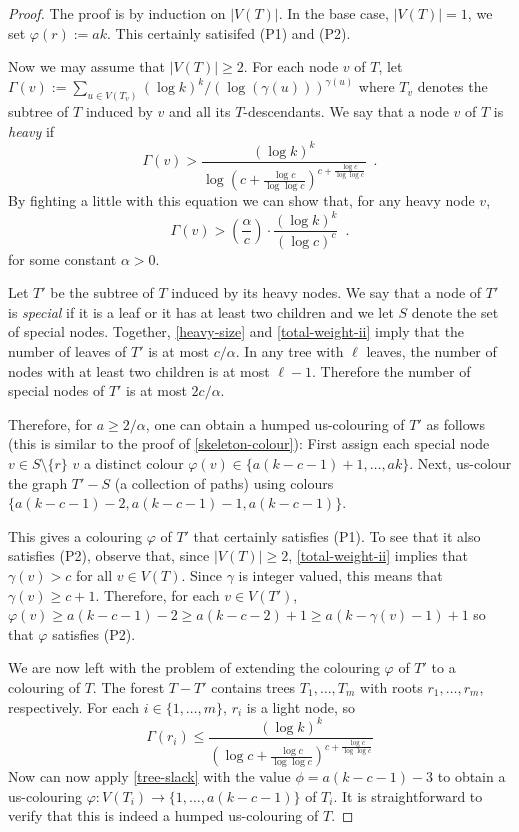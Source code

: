 \documentclass[kpfonts]{patmorin}
\begin{document}
\begin{proof}
    The proof is by induction on $|V(T)|$. In the base case, $|V(T)|=1$, we set $\varphi(r):=ak$.  This certainly satisifed (P1) and (P2).

    Now we may assume that $|V(T)|\ge 2$.  For each node $v$ of $T$, let $\Gamma(v):=\sum_{u\in V(T_v)}(\log k)^k/(\log(\gamma(u)))^{\gamma(u)}$ where $T_v$ denotes the subtree of $T$ induced by $v$ and all its $T$-descendants.  We say that a node $v$ of $T$ is \emph{heavy} if
    \[
        \Gamma(v)> \frac{(\log k)^k}{\log\left(c+\frac{\log c}{\log\log c}\right)^{c+\frac{\log c}{\log\log c}}} \enspace .
    \]
    By fighting a little with this equation we can show that, for any heavy node $v$,
    \begin{equation}
        \Gamma(v) > \left(\frac{\alpha}{c}\right)\cdot
            \frac{(\log k)^k}{(\log c)^c} \enspace . \label{heavy-size}
    \end{equation}
    for some constant $\alpha > 0$.

    Let $T'$ be the subtree of $T$ induced by its heavy nodes.  We say that a node of $T'$ is \emph{special} if it is a leaf or it has at least two children and we let $S$ denote the set of special nodes.  Together, \cref{heavy-size} and \cref{total-weight-ii} imply that the number of leaves of $T'$ is at most $c/\alpha$.  In any tree with $\ell$ leaves, the number of nodes with at least two children is at most $\ell-1$.  Therefore the number of special nodes of $T'$ is at most $2c/\alpha$.

    Therefore, for $a\ge 2/\alpha$, one can obtain a humped us-colouring of $T'$ as follows (this is similar to the proof of \cref{skeleton-colour}):  First assign each special node $v\in S\setminus\{r\}$ $v$ a distinct colour $\varphi(v)\in\{a(k-c-1)+1,\ldots,ak\}$.  Next, us-colour the graph $T'-S$ (a collection of paths) using colours $\{a(k-c-1)-2,a(k-c-1)-1,a(k-c-1)\}$.

    This gives a colouring $\varphi$ of $T'$ that certainly satisfies (P1).  To see that it also satisfies (P2), observe that, since $|V(T)|\ge 2$, \cref{total-weight-ii} implies that $\gamma(v) > c$ for all $v\in V(T)$. Since $\gamma$ is integer valued, this means that $\gamma(v)\ge c+1$.  Therefore, for each $v\in V(T')$, $\varphi(v)\ge a(k-c-1)-2 \ge a(k-c-2)+1\ge a(k-\gamma(v)-1)+1$ so that $\varphi$ satisfies (P2).

    We are now left with the problem of extending the colouring $\varphi$ of $T'$ to a colouring of $T$.  The forest $T-T'$ contains trees $T_1,\ldots,T_m$ with roots $r_1,\ldots,r_m$, respectively.  For each $i\in\{1,\ldots,m\}$, $r_i$ is a light node, so
    \[
        \Gamma(r_i) \le \frac{(\log k)^k}{\left(\log c + \frac{\log c}{\log\log c}\right)^{c+\frac{\log c}{\log\log c}}}
    \]
    Now can now apply \cref{tree-slack} with the value $\phi = a(k-c-1)-3$ to obtain a us-colouring $\varphi:V(T_i)\to\{1,\ldots,a(k-c-1)\}$ of $T_i$.  It is straightforward to verify that this is indeed a humped us-colouring of $T$.
\end{proof}
\end{document}
